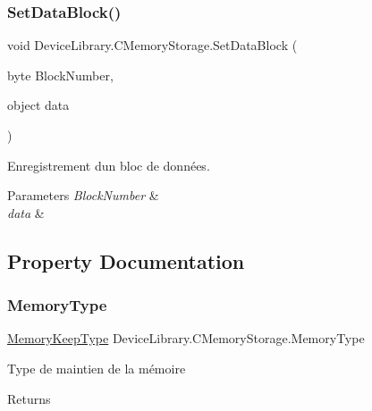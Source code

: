 \subsubsection{\texorpdfstring{Set\+Data\+Block()}{SetDataBlock()}}
{\footnotesize\ttfamily void Device\+Library.\+C\+Memory\+Storage.\+Set\+Data\+Block (\begin{DoxyParamCaption}\item[{byte}]{Block\+Number,  }\item[{object}]{data }\end{DoxyParamCaption})\hspace{0.3cm}{\ttfamily [inline]}}



Enregistrement d\textquotesingle{}un bloc de données. 


\begin{DoxyParams}{Parameters}
{\em Block\+Number} & \\
\hline
{\em data} & \\
\hline
\end{DoxyParams}


\subsection{Property Documentation}
\mbox{\label{class_device_library_1_1_c_memory_storage_a2c8371a87602ea9abac9191c69ba0c8e}} 
\subsubsection{\texorpdfstring{Memory\+Type}{MemoryType}}
{\footnotesize\ttfamily \mbox{\hyperlink{class_device_library_1_1_c_memory_storage_a212a4301a9ee4074c52046fc8b36fb7a}{Memory\+Keep\+Type}} Device\+Library.\+C\+Memory\+Storage.\+Memory\+Type\hspace{0.3cm}{\ttfamily [get]}}



Type de maintien de la mémoire 

\begin{DoxyReturn}{Returns}

\end{DoxyReturn}
\mbox{\label{class_device_library_1_1_c_memory_storage_a5149e18293f087e168b57cec9278357b}} 
